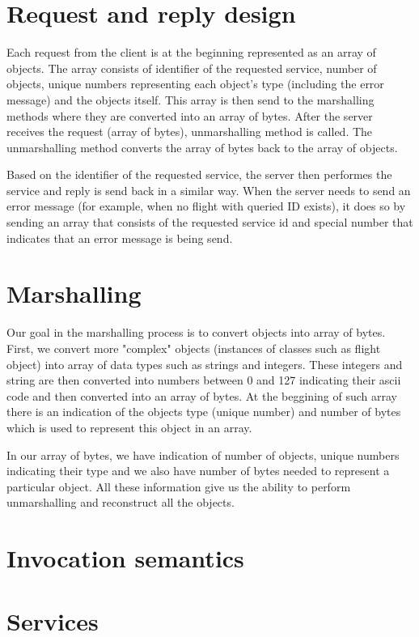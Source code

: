 \documentclass[12pt,a4paper]{article}
\begin{document}
\section{Request and reply design}
Each request from the client is at the beginning represented as an array of objects. The array consists of identifier of the requested service, number of objects, unique numbers representing each object's type (including the error message) and the objects itself. This array is then send to the marshalling methods where they are converted into an array of bytes. After the server receives the request (array of bytes), unmarshalling method is called. The unmarshalling method converts the array of bytes back to the array of objects.\par \medskip Based on the identifier of the requested service, the server then performes the service and reply is send back in a similar way. When the server needs to send an error message (for example, when no flight with queried ID exists), it does so by sending an array that consists of the requested service id and special number that indicates that an error message is being send.  

\section{Marshalling}
Our goal in the marshalling process is to convert objects into array of bytes. First, we convert more "complex" objects (instances of classes such as flight object) into array of data types such as strings and integers. These integers and string are then converted into numbers between 0 and 127 indicating their ascii code and then converted into an array of bytes. At the beggining of such array there is an indication of the objects type (unique number) and number of bytes which is used to represent this object in an array.\par \medskip
In our array of bytes, we have indication of number of objects, unique numbers indicating their type and we also have number of bytes needed to represent a particular object. All these information give us the ability to perform unmarshalling and reconstruct all the objects. 

\section{Invocation semantics}
\section{Services}
\end{document}
